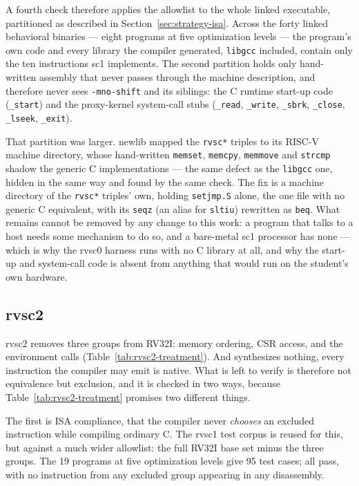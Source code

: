 A fourth check therefore applies the allowlist to the whole linked executable, partitioned as
described in Section~\ref{sec:strategy-isa}. Across the forty linked behavioral binaries --- eight
programs at five optimization levels --- the program's own code and every library the compiler
generated, \texttt{libgcc} included, contain only the ten instructions sc1 implements. The second
partition holds only hand-written assembly that never passes through the machine description, and
therefore never sees \texttt{-mno-shift} and its siblings: the C runtime start-up code
(\texttt{\_start}) and the proxy-kernel system-call stubs (\texttt{\_read}, \texttt{\_write},
\texttt{\_sbrk}, \texttt{\_close}, \texttt{\_lseek}, \texttt{\_exit}).

That partition was larger. newlib mapped the \texttt{rvsc*} triples to its RISC-V machine directory,
whose hand-written \texttt{memset}, \texttt{memcpy}, \texttt{memmove} and \texttt{strcmp} shadow the
generic C implementations --- the same defect as the \texttt{libgcc} one, hidden in the same way and
found by the same check. The fix is a machine directory of the \texttt{rvsc*} triples' own, holding
\texttt{setjmp.S} alone, the one file with no generic C equivalent, with its \texttt{seqz} (an alias
for \texttt{sltiu}) rewritten as \texttt{beq}. What remains cannot be removed by any change to this
work: a program that talks to a host needs some mechanism to do so, and a bare-metal sc1 processor
has none --- which is why the rvsc0 harness runs with no C library at all, and why the start-up and
system-call code is absent from anything that would run on the student's own hardware.

\subsection{rvsc2} \label{sec:sc2-isa-tests}

rvsc2 removes three groups from RV32I: memory ordering, CSR access, and the environment calls
(Table~\ref{tab:rvsc2-treatment}). And synthesizes nothing, every instruction the compiler may emit
is native. What is left to verify is therefore not equivalence but exclusion, and it is checked in two
ways, because Table~\ref{tab:rvsc2-treatment} promises two different things.

The first is ISA compliance, that the compiler never \textit{chooses} an excluded instruction while
compiling ordinary C. The rvsc1 test corpus is reused for this, but against a much wider allowlist:
the full RV32I base set minus the three groups. The 19 programs at five optimization levels give 95
test cases; all pass, with no instruction from any excluded group appearing in any disassembly.

